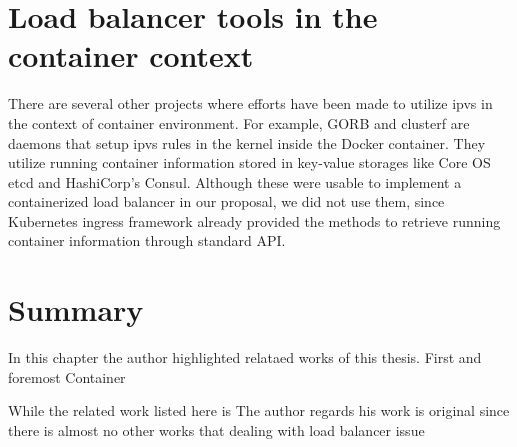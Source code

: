 \section{Load balancer tools in the container context}

There are several other projects where efforts have been made to utilize ipvs in the context of container environment.
For example, GORB\cite{Sibiryov2015} and clusterf\cite{Aaltodoc:http://urn.fi/URN:NBN:fi:aalto-201611025433} are daemons 
that setup ipvs rules in the kernel inside the Docker container. 
They utilize running container information stored in key-value storages
like Core OS etcd\cite{CoreOSEtcd} and HashiCorp's Consul\cite{HashiCorpConsul}. 
Although these were usable to implement a containerized load balancer in our proposal, we did not use them, 
since Kubernetes ingress framework already provided the methods to retrieve running container information through standard API.


\section{Summary}

In this chapter the author highlighted relataed works of this thesis.
First and foremost
Container 

While the related work listed here is
The author regards his work is original since there is almost no other works that dealing with load balancer issue 
